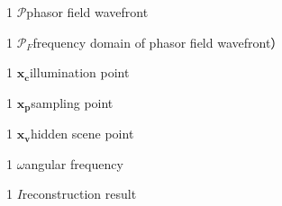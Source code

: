 \documentclass[master]{shtthesis}             %
\makeatletter
\def\ifgraduate{\ifsht@graduate}
\makeatother
\begin{document}
\ifgraduate
\begin{nomenclatures}
  \item[1]{$\mathcal{P}$}{phasor field wavefront}
  \item[1]{$\mathcal{P}_F$}{frequency domain of phasor field wavefront）}
  \item[1]{$\mathbf{x_c}$}{illumination point}
  \item[1]{$\mathbf{x_p}$}{sampling point}
  \item[1]{$\mathbf{x_v}$}{hidden scene point}
  \item[1]{$\omega$}{angular frequency}
  \item[1]{$I$}{reconstruction result}
\end{nomenclatures}
\end{document}

